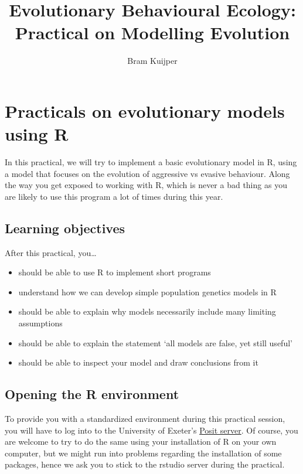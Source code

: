 \documentclass[
]{book}
\title{Evolutionary Behavioural Ecology: Practical on Modelling Evolution}
\author{Bram Kuijper}
\date{}
\providecommand{\tightlist}{%
  \setlength{\itemsep}{0pt}\setlength{\parskip}{0pt}}
\begin{document}
\maketitle

{
\setcounter{tocdepth}{1}
\tableofcontents
}
\chapter{Practicals on evolutionary models using R}\label{practicals-on-evolutionary-models-using-r}

In this practical, we will try to implement a basic evolutionary model in R, using a model that focuses on the evolution of aggressive vs evasive behaviour. Along the way you get exposed to working with R, which is never a bad thing as you are likely to use this program a lot of times during this year.

\section{Learning objectives}\label{learning-objectives}

After this practical, you\ldots{}

\begin{itemize}
\tightlist
\item
  should be able to use R to implement short programs
\item
  understand how we can develop simple population genetics models in R
\item
  should be able to explain why models necessarily include many limiting assumptions
\item
  should be able to explain the statement `all models are false, yet still useful'
\item
  should be able to inspect your model and draw conclusions from it
\end{itemize}

\section{Opening the R environment}\label{opening-the-r-environment}

To provide you with a standardized environment during this practical session, you will have to log into to the University of Exeter's \href{https://posit01.exeter.ac.uk}{Posit server}. Of course, you are welcome to try to do the same using your installation of R on your own computer, but we might run into problems regarding the installation of some packages, hence we ask you to stick to the rstudio server during the practical.
\end{document}
